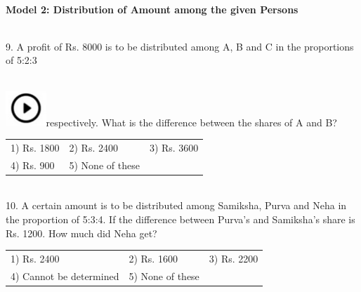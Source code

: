 \documentclass{article}
\begin{document}
	
	
	
	\noindent 
	
	\noindent 
	
	\noindent  \\  \textbf{Model 2: Distribution of Amount among the given Persons}
	
	\noindent 
	
	\noindent 
	
	\noindent \\   9.   A profit of Rs. 8000 is to be distributed among A, B and C in the proportions of 5:2:3
	
	\noindent  
	\noindent \\ \includegraphics*[width=0.60in, height=0.52in]{images/image1}respectively. What is the difference between the shares of A and B?
	
	\noindent \begin{tabular}{p{1.7in} p{1.6in} p{1.6in}} \\ 
 1) Rs. 1800                 &  2) Rs. 2400          &  3) Rs. 3600          \\
4) Rs. 900            & 5) None of these  \\
\end{tabular}
	
	\noindent 
	
	\noindent 
	
	\noindent 
	
	\noindent \\   10. A certain amount is to be distributed among Samiksha, Purva and Neha in the proportion of  5:3:4. If the difference between Purva's and Samiksha's share is Rs. 1200. How much did Neha get?
	
	\noindent \begin{tabular}{p{1.7in} p{1.6in} p{1.6in}} \\ 
 1) Rs. 2400                                                        &  2) Rs. 1600                                     &  3) Rs. 2200
	
	\noindent 
	
	\noindent \\
4) Cannot be determined                            & 5) None of these  \\
\end{tabular}
	
	\noindent 
	
\end{document}
